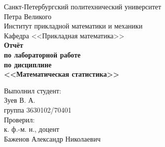 \documentclass[report1.tex]{subfiles}
\begin{document}
\begin{titlepage}
\begin{center}
	\begin{large}
		Санкт-Петербургский политехнический университет\\
		Петра Великого \\ 
		\vspace{\baselineskip}
		Институт прикладной математики и механики\\
		Кафедра <<Прикладная математика>>\\
	\vfill
	\textbf{Отчёт\\
		по лабораторной работе \\
		по дисциплине\\
		<<Математическая статистика>>}
	\end{large}
\end{center}
\vfill
\flushleft
{\addtolength{\leftskip}{\linewidth / 2}
	Выполнил студент:\\
	Зуев В. А.\\
	группа 3630102/70401\\
	Проверил:\\
	к. ф.-м. н., доцент\\
	Баженов Александр Николаевич\\
}
\vfill
{}
\end{titlepage}
\end{document}
